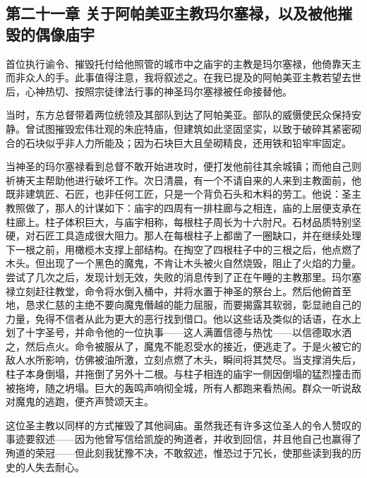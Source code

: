 
\subsection{第二十一章 关于阿帕美亚主教玛尔塞禄，以及被他摧毁的偶像庙宇}

首位执行谕令、摧毁托付给他照管的城市中之庙宇的主教是玛尔塞禄，他倚靠天主而非众人的手。此事值得注意，我将叙述之。在我已提及的阿帕美亚主教若望去世后，心神热切、按照宗徒律法行事的神圣玛尔塞禄被任命接替他。\par

当时，东方总督带着两位统领及其部队到达了阿帕美亚。部队的威慑使民众保持安静。曾试图摧毁宏伟壮观的朱庇特庙，但建筑如此坚固坚实，以致于破碎其紧密砌合的石块似乎非人力所能及；因为石块巨大且垒砌精良，还用铁和铅牢牢固定。\par

当神圣的玛尔塞禄看到总督不敢开始进攻时，便打发他前往其余城镇；而他自己则祈祷天主帮助他进行破坏工作。次日清晨，有一个不请自来的人来到主教面前，他既非建筑匠、石匠，也非任何工匠，只是一个背负石头和木料的劳工。他说：圣主教照做了，那人的计谋如下：庙宇的四周有一排柱廊与之相连，庙的上层便支承在柱廊上。柱子体积巨大，与庙宇相称，每根柱子周长为十六肘尺。石材品质特别坚硬，对石匠工具造成很大阻力。那人在每根柱子上都凿了一圈缺口，并在继续处理下一根之前，用橄榄木支撑上部结构。在掏空了四根柱子中的三根之后，他点燃了木头。但出现了一个黑色的魔鬼，不肯让木头被火自然烧毁，阻止了火焰的力量。尝试了几次之后，发现计划无效，失败的消息传到了正在午睡的主教那里。玛尔塞禄立刻赶往教堂，命令将水倒入桶中，并将水置于神圣的祭台上。然后他俯首至地，恳求仁慈的主绝不要向魔鬼僭越的能力屈服，而要揭露其软弱，彰显祂自己的力量，免得不信者从此为更大的恶行找到借口。他以这些话及类似的话语，在水上划了十字圣号，并命令他的一位执事——这人满置信德与热忱——以信德取水洒之，然后点火。命令被服从了，魔鬼不能忍受水的接近，便逃走了。于是火被它的敌人水所影响，仿佛被油所激，立刻点燃了木头，瞬间将其焚尽。当支撑消失后，柱子本身倒塌，并拖倒了另外十二根。与柱子相连的庙宇一侧因倒塌的猛烈撞击而被拖垮，随之坍塌。巨大的轰鸣声响彻全城，所有人都跑来看热闹。群众一听说敌对魔鬼的逃跑，便齐声赞颂天主。\par

这位圣主教以同样的方式摧毁了其他祠庙。虽然我还有许多这位圣人的令人赞叹的事迹要叙述——因为他曾写信给凯旋的殉道者，并收到回信，并且他自己也赢得了殉道的荣冠——但此刻我犹豫不决，不敢叙述，惟恐过于冗长，使那些读到我的历史的人失去耐心。\par

